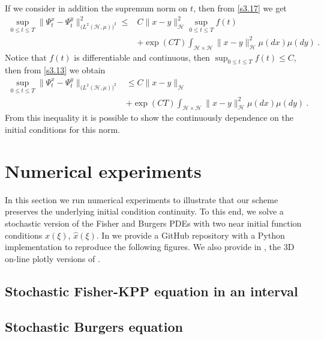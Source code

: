 \documentclass[review, onefignum, onetabnum]{siamart171218}
\begin{document}
\begin{remark}
    If we consider in addition the supremum norm on $t$, then from
    \eqref{s3.17} we get
    \begin{equation}
        \label{s3.13}
        \begin{aligned}
            \sup_{0\le t\le T}\| \Psi_t^x-\Psi_t^y\|_{
                \big(L^2(\mathcal{H},\mu) \big)^2} ^ 2
                \le&
                 C \| x-y\|_{\mathcal{H}}^2
                 \sup_{0\le t\le T} f(t)
                 \\
                 &+
                \exp(CT)
                \int_{\mathcal{H}\times \mathcal{H}}
                \|x-y\|_{\mathcal{H}}^2 \mu(dx)\mu(dy) \ .
        \end{aligned}
    \end{equation}
    Notice that $f(t)$ is differentiable and continuous, then
    $\sup_{0\le t\le T} f(t)\le C$, then from \eqref{s3.13} we obtain
    \begin{equation}
        \label{s3.14}
        \begin{aligned}
            \sup_{0\le t\le T}
            \|
                \Psi_t^x-\Psi_t^y
            \|_{\big(L^2(\mathcal{H},\mu)\big)^2}
            &\le
            C \| x-y\|_{\mathcal{H}}
            \\
            & +
            \exp(CT)
            \int_{\mathcal{H}\times \mathcal{H}}
            \| x-y\|_{\mathcal{H}}^2 \mu(dx)\mu(dy) \ .
        \end{aligned}
    \end{equation}
    From this inequality it is possible to show the continuously dependence on
    the initial conditions for this norm.
\end{remark}

\section{Numerical experiments}
        In this section we run numerical experiments to illustrate that our
    scheme preserves the underlying initial condition continuity. To 
    this end, we solve  a stochastic version of the  Fisher and Burgers PDEs 
    with two near initial function conditions $x(\xi)$, 
    $\widehat{x}(\xi)$. In \cite{matsumyaRepo} we provide a GitHub repository 
    with a Python implementation to reproduce the following figures. We also 
    provide in \cite{plotlyFisher, plotlyBurgers}, the 3D on-line plotly 
    versions of .
%
    \subsection*{Stochastic Fisher-KPP equation in an interval}
        
    \subsection*{Stochastic Burgers equation}
        
    
    
\end{document}
